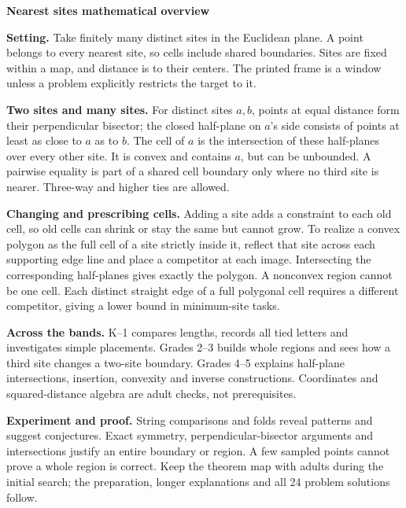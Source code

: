 {\Large\bfseries Nearest sites mathematical overview}\par
\textbf{Setting.} Take finitely many distinct sites in the Euclidean plane. A point belongs to every nearest site, so cells include shared boundaries. Sites are fixed within a map, and distance is to their centers. The printed frame is a window unless a problem explicitly restricts the target to it.

\textbf{Two sites and many sites.} For distinct sites $a,b$, points at equal distance form their perpendicular bisector; the closed half-plane on $a$'s side consists of points at least as close to $a$ as to $b$. The cell of $a$ is the intersection of these half-planes over every other site. It is convex and contains $a$, but can be unbounded. A pairwise equality is part of a shared cell boundary only where no third site is nearer. Three-way and higher ties are allowed.

\textbf{Changing and prescribing cells.} Adding a site adds a constraint to each old cell, so old cells can shrink or stay the same but cannot grow. To realize a convex polygon as the full cell of a site strictly inside it, reflect that site across each supporting edge line and place a competitor at each image. Intersecting the corresponding half-planes gives exactly the polygon. A nonconvex region cannot be one cell. Each distinct straight edge of a full polygonal cell requires a different competitor, giving a lower bound in minimum-site tasks.

\textbf{Across the bands.} K--1 compares lengths, records all tied letters and investigates simple placements. Grades 2--3 builds whole regions and sees how a third site changes a two-site boundary. Grades 4--5 explains half-plane intersections, insertion, convexity and inverse constructions. Coordinates and squared-distance algebra are adult checks, not prerequisites.

\textbf{Experiment and proof.} String comparisons and folds reveal patterns and suggest conjectures. Exact symmetry, perpendicular-bisector arguments and intersections justify an entire boundary or region. A few sampled points cannot prove a whole region is correct. Keep the theorem map with adults during the initial search; the preparation, longer explanations and all 24 problem solutions follow.
